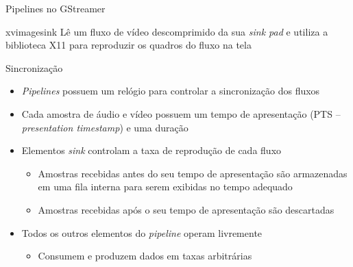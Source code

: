 \documentclass{beamer}
\def\en#1{\foreignlanguage{english}{\emph{#1}}}
\begin{document}
\begin{frame}[c]{Pipelines no GStreamer}
  \begin{block}{xvimagesink}
    Lê um fluxo de vídeo descomprimido da sua \en{sink pad} e utiliza 
    a biblioteca X11 para reproduzir os quadros do fluxo na tela
  \end{block}

  \begin{figure}
    \centering
  \end{figure}
\end{frame}

\begin{frame}[c]{Sincronização}
  \begin{itemize}
    \item \en{Pipelines} possuem um relógio para controlar a sincronização 
      dos fluxos
    \item Cada amostra de áudio e vídeo possuem um tempo de apresentação
      (PTS -- \en{presentation timestamp}) e uma duração
    \item Elementos \en{sink} controlam a taxa de reprodução de cada
      fluxo
      \begin{itemize}
        \item Amostras recebidas antes do seu tempo de apresentação são 
          armazenadas em uma fila interna para serem exibidas no 
          tempo adequado
        \item Amostras recebidas após o seu tempo de apresentação são 
          descartadas 
      \end{itemize}
    \item Todos os outros elementos do \en{pipeline} operam livremente
      \begin{itemize}
        \item Consumem e produzem dados em taxas arbitrárias
      \end{itemize}
  \end{itemize}
\end{frame}
\end{document}
